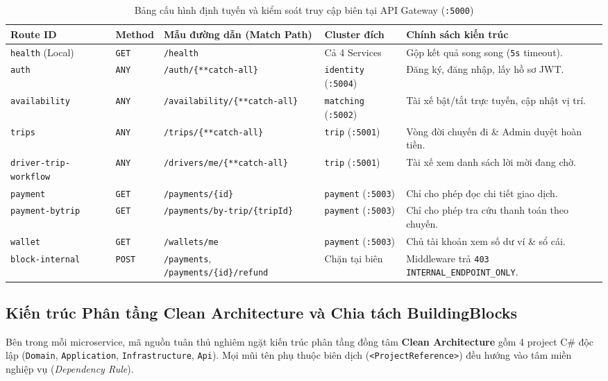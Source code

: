\documentclass[12pt,a4paper]{article}
\newcommand{\ab}{\allowbreak}
\begin{document}
{\footnotesize
\renewcommand{\arraystretch}{1.22}
\begin{table}[htbp]
\centering
\caption{Bảng cấu hình định tuyến và kiểm soát truy cập biên tại API Gateway (\texttt{:5000})}
\label{tab:gateway-routes}
\begin{tabularx}{\textwidth}{L{2.7cm} L{1.3cm} L{4.5cm} L{2.4cm} Y}
\toprule
\textbf{Route ID} & \textbf{Method} & \textbf{Mẫu đường dẫn (Match Path)} & \textbf{Cluster đích} & \textbf{Chính sách kiến trúc} \\
\midrule
\texttt{health} (Local) & \texttt{GET} & \texttt{/health} & Cả 4 Services & Gộp kết quả song song (\texttt{5s} timeout). \\
\texttt{auth} & \texttt{ANY} & \texttt{/auth/\ab \{**catch-all\}} & \texttt{identity} (\texttt{:5004}) & Đăng ký, đăng nhập, lấy hồ sơ JWT. \\
\texttt{availability} & \texttt{ANY} & \texttt{/availability/\ab \{**catch-all\}} & \texttt{matching} (\texttt{:5002}) & Tài xế bật/tắt trực tuyến, cập nhật vị trí. \\
\texttt{trips} & \texttt{ANY} & \texttt{/trips/\ab \{**catch-all\}} & \texttt{trip} (\texttt{:5001}) & Vòng đời chuyến đi \& Admin duyệt hoàn tiền. \\
\texttt{driver-trip-\ab workflow} & \texttt{ANY} & \texttt{/drivers/me/\ab \{**catch-all\}} & \texttt{trip} (\texttt{:5001}) & Tài xế xem danh sách lời mời đang chờ. \\
\texttt{payment} & \texttt{GET} & \texttt{/payments/\{id\}} & \texttt{payment} (\texttt{:5003}) & Chỉ cho phép đọc chi tiết giao dịch. \\
\texttt{payment-\ab bytrip} & \texttt{GET} & \texttt{/payments/\ab by-trip/\{tripId\}} & \texttt{payment} (\texttt{:5003}) & Chỉ cho phép tra cứu thanh toán theo chuyến. \\
\texttt{wallet} & \texttt{GET} & \texttt{/wallets/me} & \texttt{payment} (\texttt{:5003}) & Chủ tài khoản xem số dư ví \& sổ cái. \\
\texttt{block-\ab internal} & \texttt{POST} & \texttt{/payments}, \texttt{/payments/\ab \{id\}/refund} & Chặn tại biên & Middleware trả \texttt{403 INTERNAL\_\ab ENDPOINT\_ONLY}. \\
\bottomrule
\end{tabularx}
\end{table}
\renewcommand{\arraystretch}{1.0}
}

\subsection{Kiến trúc Phân tầng Clean Architecture và Chia tách BuildingBlocks}
Bên trong mỗi microservice, mã nguồn tuân thủ nghiêm ngặt kiến trúc phân tầng đồng tâm \textbf{Clean Architecture} gồm 4 project C\# độc lập (\texttt{Domain}, \texttt{Application}, \texttt{Infrastructure}, \texttt{Api}). Mọi mũi tên phụ thuộc biên dịch (\texttt{<ProjectReference>}) đều hướng vào tâm miền nghiệp vụ (\textit{Dependency Rule}).
\end{document}
